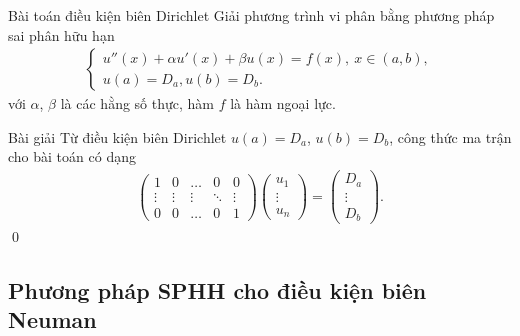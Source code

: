 \documentclass[9pt]{beamer}
\numberwithin{equation}{section}
\begin{document}
\begin{frame}
\begin{block}{Bài toán điều kiện biên Dirichlet}
    Giải phương trình vi phân bằng phương pháp sai phân hữu hạn
    \begin{align*}
        \begin{cases}
        u''(x) + \alpha u'(x) + \beta u(x) = f(x), \ x \in (a,b), \\
        u(a) = D_a, u(b) = D_b.
        \end{cases}
    \end{align*}
    với $\alpha$, $\beta$ là các hằng số thực, hàm $f$ là hàm ngoại lực.
\end{block}

\begin{exampleblock}{Bài giải}
    Từ điều kiện biên Dirichlet $u(a) = D_a$, $u(b) = D_b$, công thức ma trận cho bài toán có dạng
    \begin{align*}
        \begin{pmatrix}
            1 & 0 & \dots & 0 & 0 \\
            \vdots & \vdots & \vdots & \ddots & \vdots \\
            0 & 0 & \dots & 0 & 1
        \end{pmatrix}
        \begin{pmatrix}
            u_1 \\ \vdots \\ u_n
        \end{pmatrix} =
        \begin{pmatrix}
            D_a \\ \vdots \\ D_b
        \end{pmatrix}.
    \end{align*} \hfill \qed
\end{exampleblock}
\end{frame}

\subsection{Phương pháp SPHH cho điều kiện biên Neuman}
\end{document}
